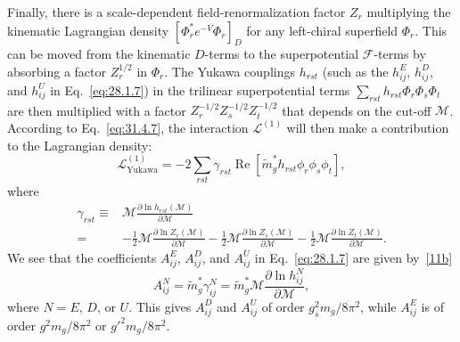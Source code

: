 Finally, there is a scale-dependent field-renormalization factor \(Z_r\)
multiplying the kinematic Lagrangian density
\([\Phi_r^*e^{-V}\Phi_r]_D\) for any left-chiral superfield \(\Phi_r\).
This can be moved from the kinematic \(D\)-terms to the superpotential
\(\mathcal F\)-terms by absorbing a factor \(Z_r^{1/2}\) in \(\Phi_r\).
The Yukawa couplings \(h_{rst}\) (such as the \(h_{ij}^E\), \(h_{ij}^D\),
and \(h_{ij}^U\) in Eq.~\eqref{eq:28.1.7}) in the trilinear
superpotential terms \(\sum_{rst}h_{rst}\Phi_r\Phi_s\Phi_t\) are then
multiplied with a factor \(Z_r^{-1/2}Z_s^{-1/2}Z_t^{-1/2}\) that depends
on the cut-off \(\mathcal M\). According to Eq.~\eqref{eq:31.4.7}, the
interaction \(\mathcal L^{(1)}\) will then make a contribution to the
Lagrangian density:
\begin{equation}
  \mathcal L_{\mathrm{Yukawa}}^{(1)}
  =-2\sum_{rst}\gamma_{rst}\operatorname{Re}
  [\widetilde m_g^*h_{rst}\phi_r\phi_s\phi_t],
  \tag{31.4.18}\label{eq:31.4.18}
\end{equation}
where
\begin{equation}
  \begin{aligned}
  \gamma_{rst}
  \equiv{}&
  \mathcal M\frac{\partial\ln h_{rst}(\mathcal M)}
                   {\partial\mathcal M}
  \\
  ={}&
  -\frac12\mathcal M\frac{\partial\ln Z_r(\mathcal M)}
                            {\partial\mathcal M}
  -\frac12\mathcal M\frac{\partial\ln Z_s(\mathcal M)}
                            {\partial\mathcal M}
  -\frac12\mathcal M\frac{\partial\ln Z_t(\mathcal M)}
                            {\partial\mathcal M}.
  \end{aligned}
  \tag{31.4.19}\label{eq:31.4.19}
\end{equation}
We see that the coefficients \(A_{ij}^E\), \(A_{ij}^D\), and \(A_{ij}^U\)
in Eq.~\eqref{eq:28.1.7} are given
by~\hyperref[ch31-ref-11b]{[11b]}
\begin{equation}
  A_{ij}^N
  =\widetilde m_g^*\gamma_{ij}^N
  =\widetilde m_g^*\mathcal M
   \frac{\partial\ln h_{ij}^N}{\partial\mathcal M},
  \tag{31.4.20}\label{eq:31.4.20}
\end{equation}
where \(N=E\), \(D\), or \(U\). This gives \(A_{ij}^D\) and \(A_{ij}^U\)
of order \(g_s^2m_g/8\pi^2\), while \(A_{ij}^E\) is of order
\(g^2m_g/8\pi^2\) or \(g'^2m_g/8\pi^2\).
